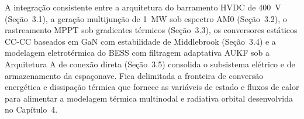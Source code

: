 \noindent A integração consistente entre a arquitetura do barramento HVDC de 400~V (Seção~3.1), a geração multijunção de 1~MW sob espectro AM0 (Seção~3.2), o rastreamento MPPT sob gradientes térmicos (Seção~3.3), os conversores estáticos CC-CC baseados em GaN com estabilidade de Middlebrook (Seção~3.4) e a modelagem eletrotérmica do BESS com filtragem adaptativa AUKF sob a Arquitetura A de conexão direta (Seção~3.5) consolida o subsistema elétrico e de armazenamento da espaçonave. Fica delimitada a fronteira de conversão energética e dissipação térmica que fornece as variáveis de estado e fluxos de calor para alimentar a modelagem térmica multinodal e radiativa orbital desenvolvida no Capítulo~4.
